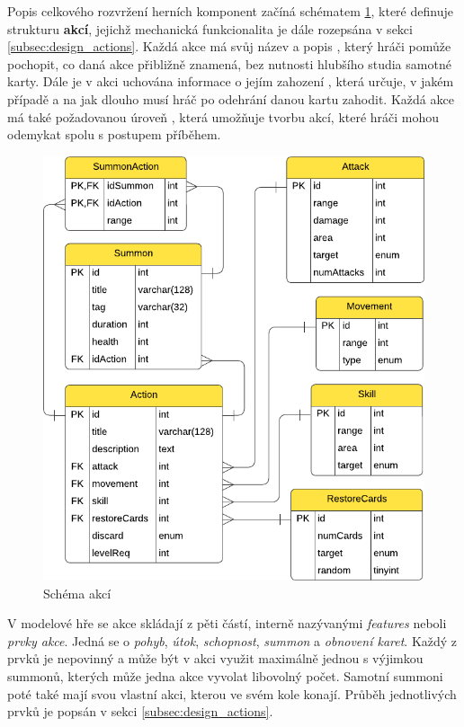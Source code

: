 Popis celkového rozvržení herních komponent začíná schématem \ref{diag:er_action}, které definuje strukturu \textbf{akcí}, jejichž mechanická funkcionalita je dále rozepsána v sekci \ref{subsec:design_actions}. Každá akce má svůj název  a popis , který hráči pomůže pochopit, co daná akce přibližně znamená, bez nutnosti hlubšího studia samotné karty. Dále je v akci uchována informace o jejím zahození , která určuje, v jakém případě a na jak dlouho musí hráč po odehrání danou kartu zahodit. Každá akce má také požadovanou úroveň , která umožňuje tvorbu akcí, které hráči mohou odemykat spolu s postupem příběhem.

\begin{figure}[h]
    \centering
    \includegraphics{../../shared/diagrams/er_action.pdf}
    \caption{Schéma akcí}
    \label{diag:er_action}
\end{figure}

V modelové hře se akce skládají z pěti částí, interně nazývanými \textit{features} neboli \textit{prvky akce}. Jedná se o \textit{pohyb}, \textit{útok}, \textit{schopnost}, \textit{summon} a \textit{obnovení karet}. Každý z prvků je nepovinný a může být v akci využit maximálně jednou s výjimkou summonů, kterých může jedna akce vyvolat libovolný počet. Samotní summoni poté také mají svou vlastní akci, kterou ve svém kole konají. Průběh jednotlivých prvků je popsán v sekci \ref{subsec:design_actions}.



